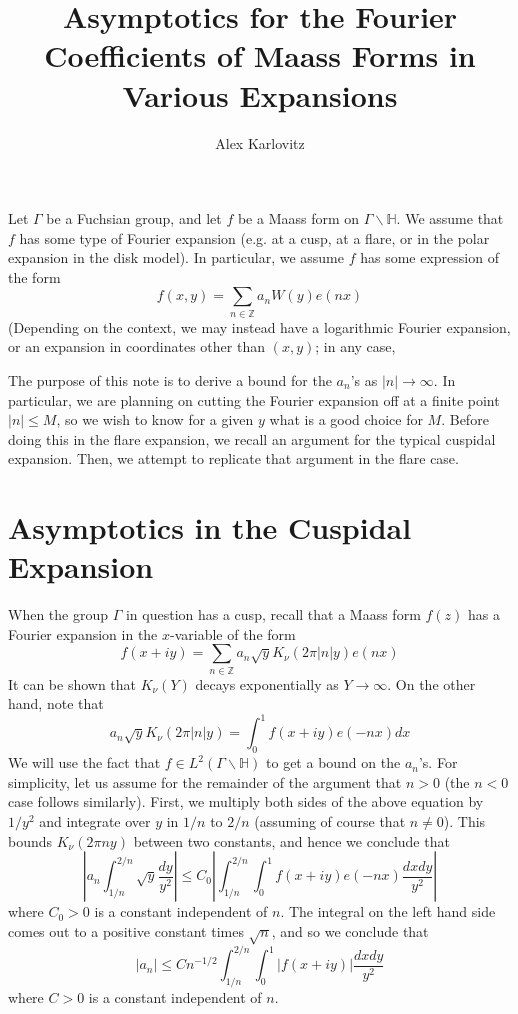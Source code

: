\documentclass[]{article}
\title{Asymptotics for the Fourier Coefficients of Maass Forms in Various Expansions}
\author{Alex Karlovitz}
\date{}
\begin{document}
	
	\maketitle

Let $\Gamma$ be a Fuchsian group, and let $f$ be a Maass form on $\Gamma\backslash\mathbb{H}$.
We assume that $f$ has some type of Fourier expansion (e.g. at a cusp, at a flare, or in the polar expansion in the disk model).
In particular, we assume $f$ has some expression of the form
$$
	f(x, y) = \sum_{n \in \mathbb{Z}}a_nW(y)e(nx)
$$
(Depending on the context, we may instead have a logarithmic Fourier expansion, or an expansion in coordinates other than $(x, y)$; in any case, 

The purpose of this note is to derive a bound for the $a_n$'s as $|n| \rightarrow \infty$.
In particular, we are planning on cutting the Fourier expansion off at a finite point $|n| \leq M$, so we wish to know for a given $y$ what is a good choice for $M$.
Before doing this in the flare expansion, we recall an argument for the typical cuspidal expansion.
Then, we attempt to replicate that argument in the flare case.
	
\section*{Asymptotics in the Cuspidal Expansion}

When the group $\Gamma$ in question has a cusp, recall that a Maass form $f(z)$ has a Fourier expansion in the $x$-variable of the form
\begin{equation}\label{cuspExp}
f(x + iy) = \sum_{n\in\mathbb{Z}}a_n\sqrt{y}K_\nu(2\pi|n|y)e(nx)
\end{equation}
It can be shown that $K_\nu(Y)$ decays exponentially as $Y \rightarrow \infty$.
On the other hand, note that
$$
a_n\sqrt{y}K_\nu(2\pi|n|y) = \int_{0}^{1}f(x + iy)e(-nx)dx
$$
We will use the fact that $f \in L^2(\Gamma\backslash\mathbb{H})$ to get a bound on the $a_n$'s.
For simplicity, let us assume for the remainder of the argument that $n > 0$ (the $n < 0$ case follows similarly).
First, we multiply both sides of the above equation by $1/y^2$ and integrate over $y$ in $1/n$ to $2/n$ (assuming of course that $n \neq 0$).
This bounds $K_{\nu}(2\pi ny)$ between two constants, and hence we conclude that
$$
\left|a_n\int_{1/n}^{2/n}\sqrt{y}\frac{dy}{y^2}\right| \leq C_0\left|\int_{1/n}^{2/n}\int_{0}^{1}f(x+iy)e(-nx)\frac{dxdy}{y^2}\right|
$$
where $C_0 > 0$ is a constant independent of $n$.
The integral on the left hand side comes out to a positive constant times $\sqrt{n}$, and so we conclude that
\begin{equation}\label{firstCuspBound}
	|a_n| \leq
	Cn^{-1/2}\int_{1/n}^{2/n}\int_{0}^{1}|f(x+iy)|\frac{dxdy}{y^2}
\end{equation}
where $C > 0$ is a constant independent of $n$.
\\
\end{document}
